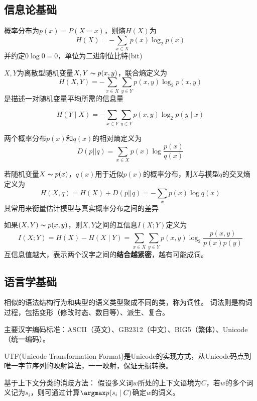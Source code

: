 \subsection{信息论基础}
\begin{definition}[熵/自信息]
概率分布为$p(x)=P(X=x)$，则熵$H(X)$为
\[H(X)=-\sum_{x\in X}p(x)\log_2p(x)\]
并约定$0\log 0=0$，单位为二进制位比特(bit)
\end{definition}
\begin{definition}[联合熵]
$X,Y$为离散型随机变量$X,Y\thicksim p(x,y)$，联合熵定义为
\[H(X,Y)=-\sum_{x\in X}\sum_{y\in Y}p(x,y)\log_2 p(x,y)\]
是描述一对随机变量平均所需的信息量
\end{definition}
\begin{definition}[条件熵]
\[H(Y\mid X)=-\sum_{x\in Y}\sum_{y\in Y}p(x,y)\log_2 p(y\mid x)\]
\end{definition}
\begin{definition}
两个概率分布$p(x)$和$q(x)$的相对熵定义为
\[D(p||q)=\sum_{x\in X}p(x)\log\frac{p(x)}{q(x)}\]
\end{definition}
\begin{definition}[交叉熵]
若随机变量$X\thicksim p(x)$，$q(x)$用于近似$p(x)$的概率分布，则$X$与模型$q$的交叉熵定义为
\[H(X,q)=H(X)+D(p||q)=-\sum_x p(x)\log q(x)\]
其常用来衡量估计模型与真实概率分布之间的差异
\end{definition}
\begin{definition}[互信息]
如果$(X,Y)\thicksim p(x,y)$，则$X,Y$之间的互信息$I(X;Y)$定义为
\[I(X;Y)=H(X)-H(X\mid Y)=\sum_{x\in X}\sum_{y\in Y}p(x,y)\log_2\frac{p(x,y)}{p(x)p(y)}\]
互信息值越大，表示两个汉字之间的\textbf{结合越紧密}，越有可能成词。
\end{definition}

\subsection{语言学基础}
\begin{definition}
相似的语法结构行为和典型的语义类型聚成不同的类，称为词性。
词法则是构词过程，包括变形（修改时态、数目等）、派生、复合。
\end{definition}

主要汉字编码标准：ASCII（英文）、GB2312（中文）、BIG5（繁体）、Unicode（统一编码）。

UTF(Unicode Transformation Format)是Unicode的实现方式，从Unicode码点到唯一字节序列的映射算法，一一映射，保证无损转换。

基于上下文分类的消歧方法：
假设多义词$w$所处的上下文语境为$C$，若$w$的多个词义记为$s_i$，则可通过计算$\argmax p(s_i\mid C)$确定$w$的词义。

